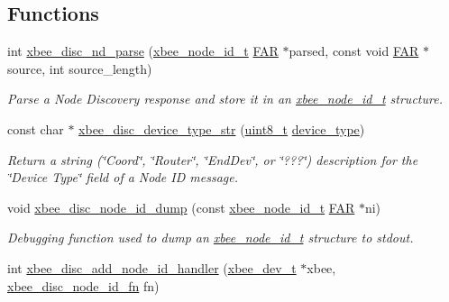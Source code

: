 \subsection*{Functions}
\begin{DoxyCompactItemize}
\item 
int \hyperlink{group__xbee__discovery_ga1efd48449a49119fc19ab9843af5ef6c}{xbee\+\_\+disc\+\_\+nd\+\_\+parse} (\hyperlink{structxbee__node__id__t}{xbee\+\_\+node\+\_\+id\+\_\+t} \hyperlink{group__hal_gaef060b3456fdcc093a7210a762d5f2ed}{F\+AR} $\ast$parsed, const void \hyperlink{group__hal_gaef060b3456fdcc093a7210a762d5f2ed}{F\+AR} $\ast$source, int source\+\_\+length)
\begin{DoxyCompactList}\small\item\em Parse a Node Discovery response and store it in an \hyperlink{structxbee__node__id__t}{xbee\+\_\+node\+\_\+id\+\_\+t} structure. \end{DoxyCompactList}\item 
const char $\ast$ \hyperlink{group__xbee__discovery_ga8eb851e497917304412328f434af7c95}{xbee\+\_\+disc\+\_\+device\+\_\+type\+\_\+str} (\hyperlink{group__hal__dos_gae1affc9ca37cfb624959c866a73f83c2}{uint8\+\_\+t} \hyperlink{group__xbee__discovery_gab9c960832b7e834e6657e0c6ab4c3d8a}{device\+\_\+type})
\begin{DoxyCompactList}\small\item\em Return a string (\char`\"{}\+Coord\char`\"{}, \char`\"{}\+Router\char`\"{}, \char`\"{}\+End\+Dev\char`\"{}, or \char`\"{}???\char`\"{}) description for the \char`\"{}\+Device Type\char`\"{} field of a Node ID message. \end{DoxyCompactList}\item 
void \hyperlink{group__xbee__discovery_gab155a485a9aa4870a45dd86d1d468c52}{xbee\+\_\+disc\+\_\+node\+\_\+id\+\_\+dump} (const \hyperlink{structxbee__node__id__t}{xbee\+\_\+node\+\_\+id\+\_\+t} \hyperlink{group__hal_gaef060b3456fdcc093a7210a762d5f2ed}{F\+AR} $\ast$ni)
\begin{DoxyCompactList}\small\item\em Debugging function used to dump an \hyperlink{structxbee__node__id__t}{xbee\+\_\+node\+\_\+id\+\_\+t} structure to stdout. \end{DoxyCompactList}\item 
int \hyperlink{group__xbee__discovery_ga59a0294fbcb1b9f43b8436d4ec3a5a9e}{xbee\+\_\+disc\+\_\+add\+\_\+node\+\_\+id\+\_\+handler} (\hyperlink{structxbee__dev__t}{xbee\+\_\+dev\+\_\+t} $\ast$xbee, \hyperlink{group__xbee__device_ga64bf72cf58030a080f12f8916cd7d2a2}{xbee\+\_\+disc\+\_\+node\+\_\+id\+\_\+fn} fn)

\end{DoxyCompactItemize}

